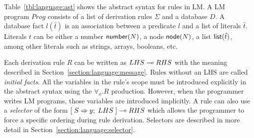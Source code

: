 Table~\ref{tbl:language:ast} shows the abstract syntax for rules in LM.  A LM
program $Prog$ consists of a list of derivation rules $\Sigma$ and a database
$D$. A database fact $l(\hat{t})$ is an association between a predicate $l$ and
a list of literals $\hat{t}$. Literals $t$ can be either a number
$\mathsf{number}(N)$, a node $\mathsf{node}(N)$, a list $\mathsf{list}(\hat{t})$, among other
literals such as strings, arrays, booleans, etc.

Each derivation rule $R$ can be written as $LHS \multimap RHS$ with the meaning
described in Section~\ref{section:language:message}. Rules without an LHS are
called \emph{initial facts}. All the variables in the rule's scope must be
introduced explicitly in the abstract syntax using the $\forall_x. R$
production. However, when the programmer writes LM programs, those variables are
introduced implicitly. A rule can also use a \emph{selector} of the form
$[\; S \Rightarrow y; \; LHS \;] \multimap RHS$ which allows the programmer to force a specific
ordering during rule derivation. Selectors are described in more detail in
Section~\ref{section:language:selector}.

\newcommand{\sop}[0]{\Vert}

